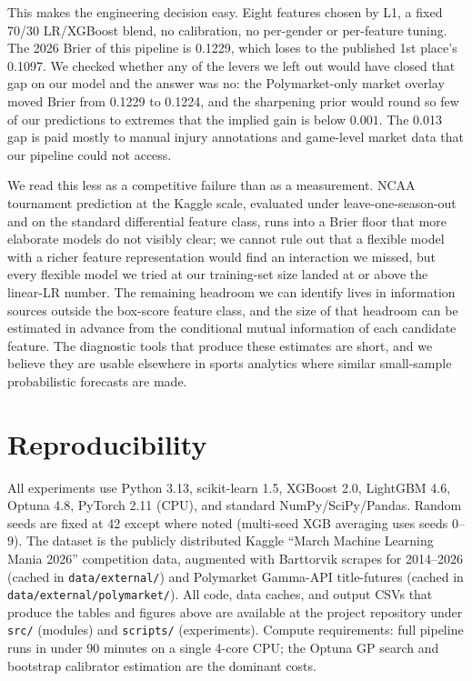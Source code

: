 \documentclass[11pt,a4paper]{article}
\theoremstyle{definition}
\begin{document}
This makes the engineering decision easy. Eight features chosen by L1, a fixed 70/30 LR/XGBoost blend, no calibration, no per-gender or per-feature tuning. The 2026 Brier of this pipeline is 0.1229, which loses to the published 1st place's 0.1097. We checked whether any of the levers we left out would have closed that gap on our model and the answer was no: the Polymarket-only market overlay moved Brier from 0.1229 to 0.1224, and the sharpening prior would round so few of our predictions to extremes that the implied gain is below $0.001$. The 0.013 gap is paid mostly to manual injury annotations and game-level market data that our pipeline could not access.

We read this less as a competitive failure than as a measurement. NCAA tournament prediction at the Kaggle scale, evaluated under leave-one-season-out and on the standard differential feature class, runs into a Brier floor that more elaborate models do not visibly clear; we cannot rule out that a flexible model with a richer feature representation would find an interaction we missed, but every flexible model we tried at our training-set size landed at or above the linear-LR number. The remaining headroom we can identify lives in information sources outside the box-score feature class, and the size of that headroom can be estimated in advance from the conditional mutual information of each candidate feature. The diagnostic tools that produce these estimates are short, and we believe they are usable elsewhere in sports analytics where similar small-sample probabilistic forecasts are made.

\section*{Reproducibility}

All experiments use Python 3.13, scikit-learn 1.5, XGBoost 2.0, LightGBM 4.6, Optuna 4.8, PyTorch 2.11 (CPU), and standard NumPy/SciPy/Pandas. Random seeds are fixed at 42 except where noted (multi-seed XGB averaging uses seeds $0$--$9$). The dataset is the publicly distributed Kaggle ``March Machine Learning Mania 2026'' competition data, augmented with Barttorvik scrapes for 2014--2026 (cached in \texttt{data/external/}) and Polymarket Gamma-API title-futures (cached in \texttt{data/external/polymarket/}). All code, data caches, and output CSVs that produce the tables and figures above are available at the project repository under \texttt{src/} (modules) and \texttt{scripts/} (experiments). Compute requirements: full pipeline runs in under 90 minutes on a single 4-core CPU; the Optuna GP search and bootstrap calibrator estimation are the dominant costs.
\end{document}
